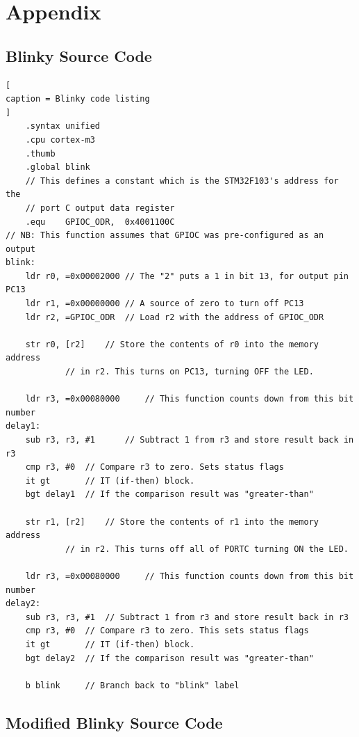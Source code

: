 \documentclass{UoNMCHA}
\numberwithin{equation}{section}
\begin{document}
\pagebreak

\section{Appendix}

\subsection{Blinky Source Code}

\begin{lstlisting}[
caption = Blinky code listing
]
    .syntax unified
    .cpu cortex-m3
    .thumb
    .global blink
    // This defines a constant which is the STM32F103's address for the
    // port C output data register
    .equ	GPIOC_ODR,	0x4001100C
// NB: This function assumes that GPIOC was pre-configured as an output
blink:
	ldr r0, =0x00002000 // The "2" puts a 1 in bit 13, for output pin PC13
	ldr r1, =0x00000000 // A source of zero to turn off PC13
	ldr r2, =GPIOC_ODR  // Load r2 with the address of GPIOC_ODR

	str r0, [r2] 	// Store the contents of r0 into the memory address
			// in r2. This turns on PC13, turning OFF the LED.

	ldr r3, =0x00080000 	// This function counts down from this bit number
delay1:
	sub r3, r3, #1   	// Subtract 1 from r3 and store result back in r3
	cmp r3, #0	// Compare r3 to zero. Sets status flags
	it gt		// IT (if-then) block.
	bgt delay1	// If the comparison result was "greater-than"

	str r1, [r2]	// Store the contents of r1 into the memory address
			// in r2. This turns off all of PORTC turning ON the LED.

	ldr r3, =0x00080000 	// This function counts down from this bit number
delay2:
	sub r3, r3, #1	// Subtract 1 from r3 and store result back in r3
	cmp r3, #0	// Compare r3 to zero. This sets status flags
	it gt		// IT (if-then) block.
	bgt delay2	// If the comparison result was "greater-than"

	b blink		// Branch back to "blink" label
\end{lstlisting}

\newpage

\subsection{Modified Blinky Source Code} \label{modified}
\end{document}
